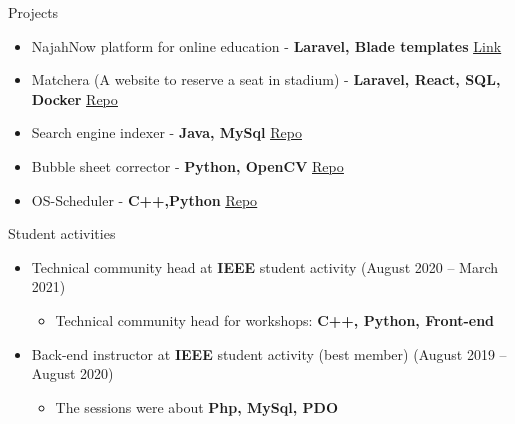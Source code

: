 \documentclass{resume}
\begin{document}
\begin{rSection}{Projects}
  \begin{itemize}
    \item NajahNow platform for online education - \textbf{Laravel, Blade templates} \hfill{\underline{\href{https://najahnow.net}{Link}}}
    \item Matchera (A website to reserve a seat in stadium) - \textbf{Laravel, React, SQL, Docker} \hfill{\underline{\href{https://github.com/sofyanmahmoud0000/Matchera}{Repo}}}
    \item Search engine indexer - \textbf{Java, MySql} \hfill{\underline{\href{https://github.com/sofyanmahmoud0000/Jindexer}{Repo}}}
    \item Bubble sheet corrector - \textbf{Python, OpenCV} \hfill{\underline{\href{https://github.com/sofyanmahmoud0000/BSCorrector}{Repo}}}
    \item OS-Scheduler - \textbf{C++,Python} \hfill{\underline{\href{https://github.com/sofyanmahmoud0000/OS-Scheduler}{Repo}}}
  \end{itemize}
\end{rSection}

\begin{rSection}{Student activities}
  \begin{itemize}
    \item Technical community head at \textbf{IEEE} student activity \hfill{(August 2020 – March 2021)}
    \begin{itemize}
        \item Technical community head for workshops: \textbf{C++, Python, Front-end}
    \end{itemize}
    \item Back-end instructor at \textbf{IEEE} student activity (best member) \hfill{(August 2019 – August 2020)}
    \begin{itemize}
        \item The sessions were about \textbf{Php, MySql, PDO}
    \end{itemize}
  \end{itemize}
\end{rSection}


\end{document}

